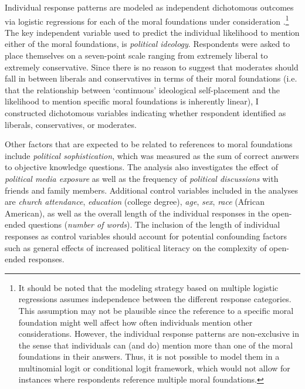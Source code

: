 \documentclass[12pt]{article}
\begin{document}
Individual response patterns are modeled as independent dichotomous outcomes via logistic regressions for each of the moral foundations under consideration \citep[c.f. for example][]{agresti1999modeling}.\footnote{It should be noted that the modeling strategy based on multiple logistic regressions assumes independence between the different response categories. This assumption may not be plausible since the reference to a specific moral foundation might well affect how often individuals mention other considerations. However, the individual response patterns are non-exclusive in the sense that individuals can (and do) mention more than one of the moral foundations in their answers. Thus, it is not possible to model them in a multinomial logit or conditional logit framework, which would not allow for instances where respondents reference multiple moral foundations.} The key independent variable used to predict the individual likelihood to mention either of the moral foundations, is \textit{political ideology}. Respondents were asked to place themselves on a seven-point scale ranging from extremely liberal to extremely conservative. Since there is no reason to suggest that moderates should fall in between liberals and conservatives in terms of their moral foundations (i.e. that the relationship between `continuous' ideological self-placement and the likelihood to mention specific moral foundations is inherently linear), I constructed dichotomous variables indicating whether respondent identified as liberals, conservatives, or moderates.

Other factors that are expected to be related to references to moral foundations include \textit{political sophistication}, which was measured as the sum of correct answers to objective knowledge questions. The analysis also investigates the effect of \textit{political media exposure} as well as the frequency of \textit{political discussions} with friends and family members. Additional control variables included in the analyses are \textit{church attendance}, \textit{education} (college degree), \textit{age}, \textit{sex}, \textit{race} (African American), as well as the overall length of the individual responses in the open-ended questions (\textit{number of words}). The inclusion of the length of individual responses as control variables should account for potential confounding factors such as general effects of increased political literacy on the complexity of open-ended responses.
\end{document}

